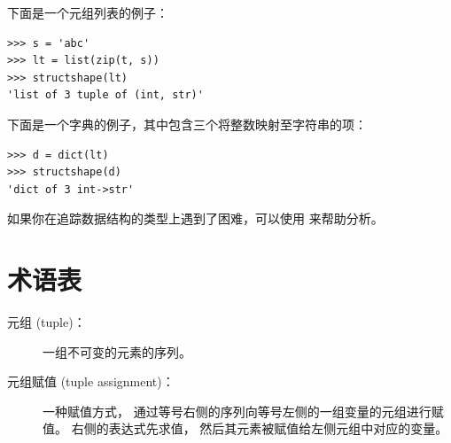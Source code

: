 {%

下面是一个元组列表的例子：

\begin{lstlisting}
>>> s = 'abc'
>>> lt = list(zip(t, s))
>>> structshape(lt)
'list of 3 tuple of (int, str)'
\end{lstlisting}

%

下面是一个字典的例子，其中包含三个将整数映射至字符串的项：

\begin{lstlisting}
>>> d = dict(lt)
>>> structshape(d)
'dict of 3 int->str'
\end{lstlisting}

%

如果你在追踪数据结构的类型上遇到了困难，可以使用  来帮助分析。

\section{术语表}

\begin{description}


\item[元组 (tuple)：] 一组不可变的元素的序列。


\item[元组赋值 (tuple assignment)：] 一种赋值方式， 通过等号右侧的序列向等号左侧的一组变量的元组进行赋值。  
右侧的表达式先求值， 然后其元素被赋值给左侧元组中对应的变量。  
 



\end{description}}
